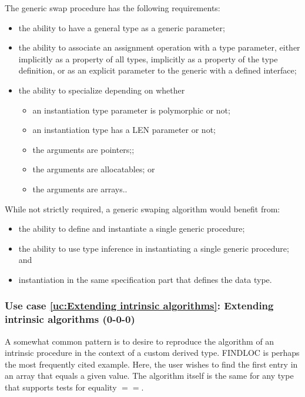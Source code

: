 \documentclass{article}
\newcounter{usecase}
\newcounter{requirement}
\newcommand{\newusecase}[2]{
\refstepcounter{usecase}\label{uc:#1}
\subsubsection{Use case \ref{uc:#1}: #1 (#2)}}
\begin{document}
The generic swap procedure has the following requirements:
\begin{itemize}
\item the ability to have a general type as a generic parameter;

\item the ability to associate an assignment operation with a type
  parameter, either implicitly as a property of all types, implicitly
  as a property of the type definition, or as an explicit parameter to
  the generic with a defined interface;

\item the ability to specialize depending on whether 
  \begin{itemize}
    \item an instantiation type parameter is polymorphic or not;
    \item an instantiation type has a LEN parameter or not;
    \item the arguments are pointers;;
    \item the arguments are allocatables; or
    \item the  arguments are arrays..
  \end{itemize}

\end{itemize}
While not strictly required, a generic swaping algorithm would benefit
from:
\begin{itemize}
\item the ability to define and instantiate a single generic procedure;

\item the ability to use type inference in instantiating a single generic
  procedure; and

\item instantiation in the same specification part that defines the data
  type.
\end{itemize}

\newusecase{Extending intrinsic algorithms}{0-0-0}
A somewhat common pattern is to desire to reproduce the algorithm of an intrinsic procedure in the context of a custom derived type.    {\rm FINDLOC} is perhaps the most frequently cited example.    Here, the user wishes to find the first entry in an array that equals a given value.    The algorithm itself is the same for any type that supports tests for equality $==$.
\end{document}
